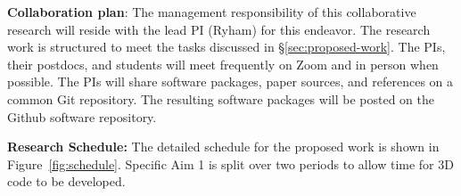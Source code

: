 \medskip

\textbf{Collaboration plan}: 
%
The management responsibility of this collaborative research will reside
with the lead PI (Ryham) for this endeavor. The research work is
structured to meet the tasks discussed in \S\ref{sec:proposed-work}.
%
The PIs, their postdocs, and students will meet frequently on Zoom and
in person when possible. The PIs will share software packages, paper
sources, and references on a common \textsf{Git} repository. The
resulting software packages will be posted on the \textsf{Github}
software repository.

\medskip

\textbf{Research Schedule:} The detailed schedule for the proposed work
is shown in Figure~\ref{fig:schedule}. Specific Aim 1 is split over two
periods to allow time for 3D code to be developed.


